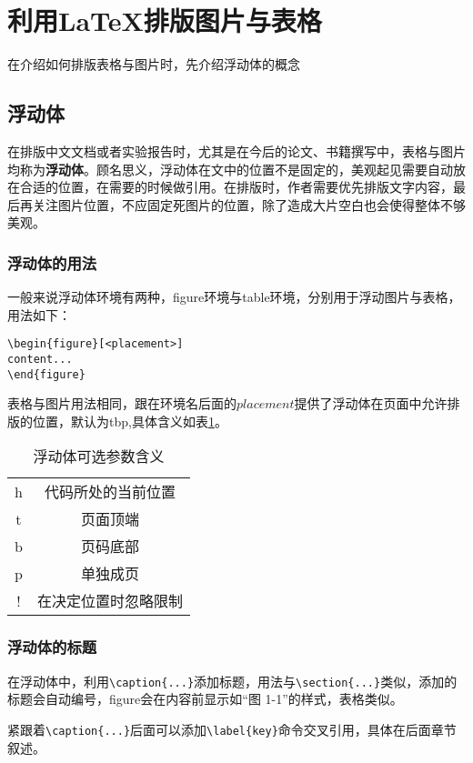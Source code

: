 \section{利用\LaTeX 排版图片与表格}
在介绍如何排版表格与图片时，先介绍浮动体的概念
\subsection{浮动体}
在排版中文文档或者实验报告时，尤其是在今后的论文、书籍撰写中，表格与图片均称为\textbf{浮动体}。顾名思义，浮动体在文中的位置不是固定的，美观起见需要自动放在合适的位置，在需要的时候做引用。在排版时，作者需要优先排版文字内容，最后再关注图片位置，不应固定死图片的位置，除了造成大片空白也会使得整体不够美观。
\subsubsection{浮动体的用法}
一般来说浮动体环境有两种，figure环境与table环境，分别用于浮动图片与表格，用法如下：
\begin{verbatim}
\begin{figure}[<placement>]
content...
\end{figure}
\end{verbatim}

表格与图片用法相同，跟在环境名后面的$placement$提供了浮动体在页面中允许排版的位置，默认为tbp,具体含义如表\ref{sec2:浮动体可选参数含义}。
\begin{table}[h!]
\caption{浮动体可选参数含义}
\label{sec2:浮动体可选参数含义}
\centering
\begin{tabular}{cc}
\hline
h&代码所处的当前位置\\
t&页面顶端\\
b&页码底部\\
p&单独成页\\
!&在决定位置时忽略限制\\
\hline
\end{tabular}
\end{table}
\subsubsection{浮动体的标题}
在浮动体中，利用\verb|\caption{...}|添加标题，用法与\verb|\section{...}|类似，添加的标题会自动编号，figure会在内容前显示如“图 1-1”的样式，表格类似。

紧跟着\verb|\caption{...}|后面可以添加\verb|\label{key}|命令交叉引用，具体在后面章节叙述。

